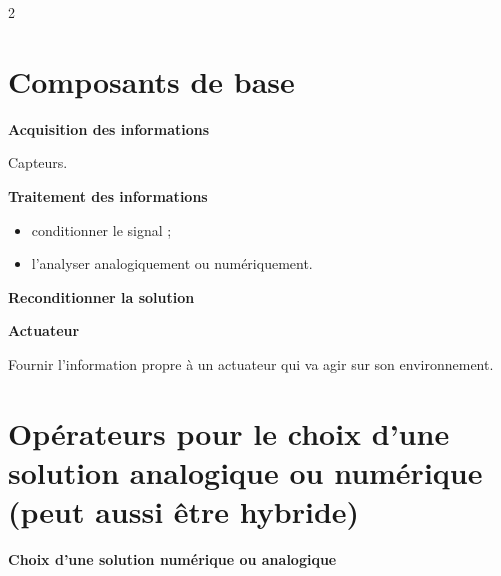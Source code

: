 \documentclass[a4paper,9pt]{extarticle}
\begin{document}
\thispagestyle{fancy}

\footnotesize

\begin{multicols}{2}


\section{Composants de base}


\begin{definition}

\textbf{Acquisition des informations}

Capteurs.

\textbf{Traitement des informations}

\begin{itemize}

\item conditionner le signal ;

\item l'analyser analogiquement ou numériquement.

\end{itemize}

\textbf{Reconditionner la solution}

\textbf{Actuateur}

Fournir l'information propre à un actuateur qui va agir sur son environnement.

\end{definition}



\section{Opérateurs pour le choix d'une solution analogique ou numérique (peut aussi être hybride)}


\begin{example}

\centering

\textbf{Choix d'une solution numérique ou analogique}

\vspace{3pt}

\renewcommand{\arraystretch}{1.15}

\begin{tabular}{|p{0.42\linewidth}|p{0.42\linewidth}|}

\hline


\end{tabular}
\end{example}
\end{multicols}
\end{document}
